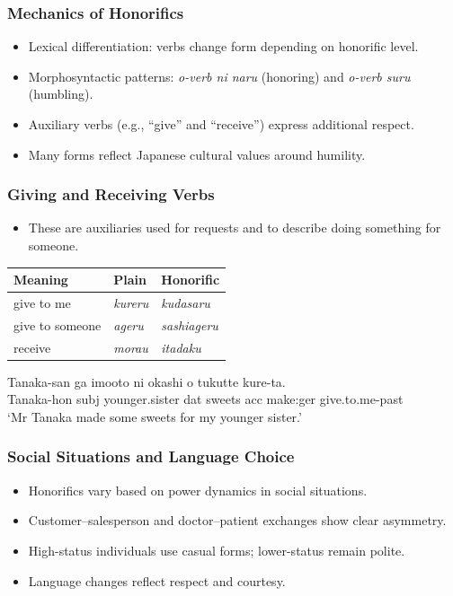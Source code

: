 \documentclass[xetex]{beamer}
\begin{document}
\begin{frame}
\frametitle{Mechanics of Honorifics}
\begin{itemize}
    \item Lexical differentiation: verbs change form depending on honorific level.
    \item Morphosyntactic patterns: \textit{o-verb ni naru} (honoring) and \textit{o-verb suru} (humbling).
    \item Auxiliary verbs (e.g., “give” and “receive”) express additional respect.
    \item Many forms reflect Japanese cultural values around humility.
\end{itemize}
\end{frame}

\begin{frame}
\frametitle{Giving and Receiving Verbs}

\begin{itemize}
\item These are auxiliaries used for requests and to describe doing something for someone.
\end{itemize}

\begin{tabular}{lll}
\textbf{Meaning} & \textbf{Plain} & \textbf{Honorific} \\
\hline
give to me & \textit{kureru} & \textit{kudasaru} \\
give to someone & \textit{ageru} & \textit{sashiageru} \\
receive & \textit{morau} & \textit{itadaku} \\

\end{tabular}

\begin{exe}
    \ex \gll Tanaka-san ga imooto ni okashi o tukutte kure-ta. \\
        Tanaka-hon subj younger.sister dat sweets acc make:ger give.to.me-past \\
        \trans ‘Mr Tanaka made some sweets for my younger sister.’
\end{exe}
\end{frame}

\begin{frame}
\frametitle{Social Situations and Language Choice}
\begin{itemize}
    \item Honorifics vary based on power dynamics in social situations.
    \item Customer–salesperson and doctor–patient exchanges show clear asymmetry.
    \item High-status individuals use casual forms; lower-status remain polite.
    \item Language changes reflect respect and courtesy.
\end{itemize}
\end{frame}
\end{document}
